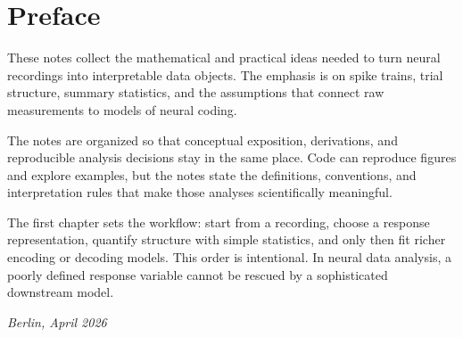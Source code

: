 \chapter*{Preface}

These notes collect the mathematical and practical ideas needed to turn neural recordings into interpretable data objects. The emphasis is on spike trains, trial structure, summary statistics, and the assumptions that connect raw measurements to models of neural coding.

The notes are organized so that conceptual exposition, derivations, and reproducible analysis decisions stay in the same place. Code can reproduce figures and explore examples, but the notes state the definitions, conventions, and interpretation rules that make those analyses scientifically meaningful.

The first chapter sets the workflow: start from a recording, choose a response representation, quantify structure with simple statistics, and only then fit richer encoding or decoding models. This order is intentional. In neural data analysis, a poorly defined response variable cannot be rescued by a sophisticated downstream model.

\bigskip
\noindent\textit{Berlin, April 2026}

